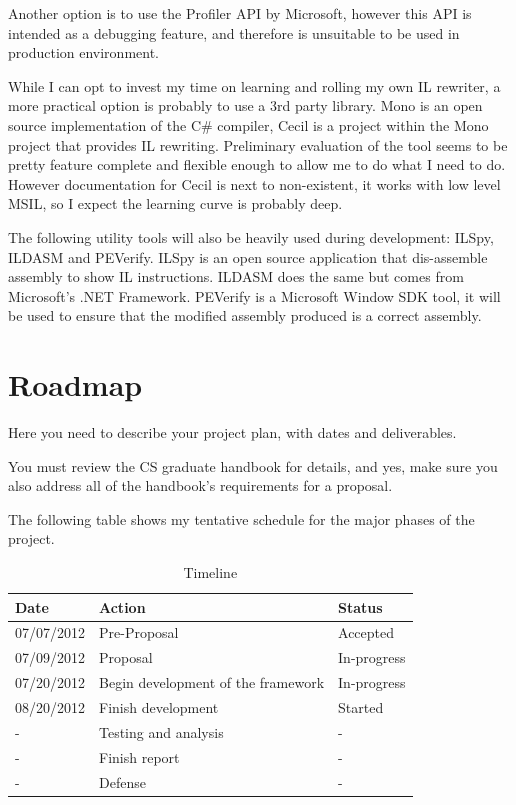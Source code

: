Another option is to use the Profiler API by Microsoft, however this API is intended as a debugging feature, and therefore is unsuitable to be used in production environment.

While I can opt to invest my time on learning and rolling my own IL rewriter, a more practical option is probably to use a 3rd party library. Mono is an open source implementation of the C\# compiler, Cecil is a project within the Mono project that provides IL rewriting. Preliminary evaluation of the tool seems to be pretty feature complete and flexible enough to allow me to do what I need to do. However documentation for Cecil is next to non-existent, it works with low level MSIL, so I expect the learning curve is probably deep.

The following utility tools will also be heavily used during development: ILSpy, ILDASM and PEVerify. ILSpy is an open source application that dis-assemble assembly to show IL instructions. ILDASM does the same but comes from Microsoft’s .NET Framework. PEVerify is a Microsoft Window SDK tool, it will be used to ensure that the modified assembly produced is a correct assembly.

\section{Roadmap}

Here you need to describe your project plan, with dates and deliverables. 

You must review the CS graduate handbook for details, and yes, make
sure you also address all of the handbook's requirements for a
proposal.

The following table shows my tentative schedule for the major phases of the project.

\begin{table}[h]
\centering
\begin{tabular}{|l|l|l|}
\hline
Date & Action & Status\\
\hline
07/07/2012 & Pre-Proposal & Accepted\\
07/09/2012 & Proposal & In-progress\\
07/20/2012 & Begin development of the framework & In-progress\\
08/20/2012 & Finish development & Started\\
- & Testing and analysis & - \\
- & Finish report & - \\
- & Defense & - \\
\hline
\end{tabular}
\caption{Timeline}
\label{tab:template}
\end{table}



\singlespacing




